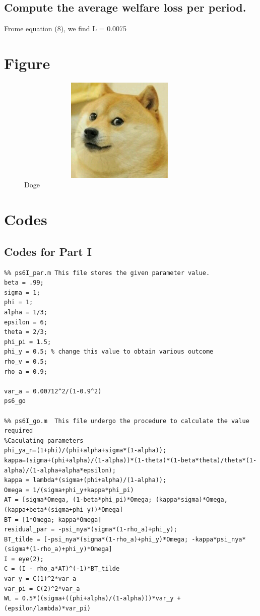 \documentclass[12pt]{article}
\begin{document}
\subsection{Compute the average welfare loss per period.}
Frome equation (8), we find 
L = 0.0075
\newpage

\section{Figure}

\begin{figure}
\centering
   \includegraphics[height=5cm, width=10cm]{img/doge.jpg}
  \caption{Doge}
  \label{fig:stock}
\end{figure}



\section{Codes}

\subsection{Codes for Part I}
\begin{verbatim}
%% ps6I_par.m This file stores the given parameter value.
beta = .99;
sigma = 1;
phi = 1;
alpha = 1/3;
epsilon = 6;
theta = 2/3;
phi_pi = 1.5;
phi_y = 0.5; % change this value to obtain various outcome
rho_v = 0.5;
rho_a = 0.9;

var_a = 0.00712^2/(1-0.9^2)
ps6_go

%% ps6I_go.m  This file undergo the procedure to calculate the value required
%Caculating parameters 
phi_ya_n=(1+phi)/(phi+alpha+sigma*(1-alpha));
kappa=(sigma+(phi+alpha)/(1-alpha))*(1-theta)*(1-beta*theta)/theta*(1-alpha)/(1-alpha+alpha*epsilon);
kappa = lambda*(sigma+(phi+alpha)/(1-alpha));
Omega = 1/(sigma+phi_y+kappa*phi_pi)
AT = [sigma*Omega, (1-beta*phi_pi)*Omega; (kappa*sigma)*Omega, (kappa+beta*(sigma+phi_y))*Omega]
BT = [1*Omega; kappa*Omega]
residual_par = -psi_nya*(sigma*(1-rho_a)+phi_y);
BT_tilde = [-psi_nya*(sigma*(1-rho_a)+phi_y)*Omega; -kappa*psi_nya*(sigma*(1-rho_a)+phi_y)*Omega]
I = eye(2);
C = (I - rho_a*AT)^(-1)*BT_tilde
var_y = C(1)^2*var_a
var_pi = C(2)^2*var_a
WL = 0.5*((sigma+((phi+alpha)/(1-alpha)))*var_y + (epsilon/lambda)*var_pi)
\end{verbatim}
\end{document}
